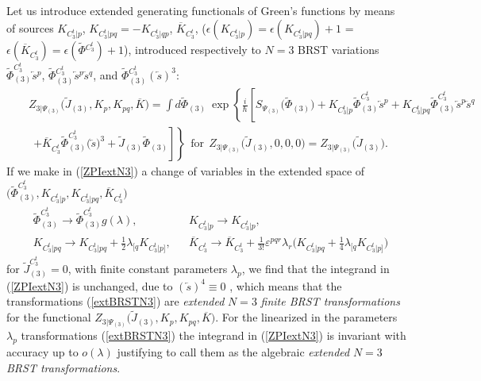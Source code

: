 \documentclass[10pt]{article}
\begin{document}
Let us introduce extended generating functionals of Green's functions
by means of sources $K_{C^t_3|p}$,  $K_{C^t_3|pq}=-K_{C^t_3|qp}$, $\overline{K}_{C^t_3}$,
($\epsilon(K_{C^t_3|p})=\epsilon(K_{C^t_3|pq})+1$ = $\epsilon(\overline{K}_{C^t_3})=\epsilon(\widetilde{\Phi}{}^{C^t_3})+1$),
introduced respectively to $N=3$ BRST variations $\widetilde{\Phi}^{C^t_3}_{(3)} \overleftarrow{s}{}^p$,
$\widetilde{\Phi}{}_{(3)}^{C^t_3} \overleftarrow{s}{}^p\overleftarrow{s}{}^q$, and $\widetilde{\Phi}{}_{(3)}^{C^t_3} (\overleftarrow{s})^3$:
\begin{eqnarray}
&& Z_{3|\Psi_{(3)}}\big(\widetilde{J}_{(3)}, K_{p},  K_{pq}, \overline{K}\big)=\int d\widetilde{\Phi}_{(3)}\ \exp\left\{
\frac{i}{\hbar}\left[  {S}_{\Psi_{(3)}}\big(\widetilde{\Phi}_{(3)}\big) +  K_{C^t_3|p} \widetilde{\Phi}_{(3)}^{C^t_3} \overleftarrow{s}^p + K_{C^t_3|pq} \widetilde{\Phi}_{(3)}^{C^t_3} \overleftarrow{s}^p\overleftarrow{s}^q \right.\right. \nonumber \\
&& \ \  \left.\left.+ \overline{K}_{C^t_3}  \widetilde{\Phi}_{(3)}^{C^t_3} \big(\overleftarrow{s}\big)^3%
+\widetilde{J}_{(3)}\widetilde{\Phi}_{(3)}\right]  \right\}    \ \ \mathrm{for}\ \ Z_{3|\Psi_{(3)}}\big(\widetilde{J}_{(3)},0,0,0\big)=Z_{3|\Psi_{(3)}}\big(\widetilde{J}_{(3)}\big).\label{ZPIextN3}%
\end{eqnarray}
If we make in (\ref{ZPIextN3}) a change of variables in the
extended space of $\big(\widetilde{\Phi}_{(3)}^{C_3^t}, K_{C_3^t|p},  K_{C_3^t|pq}, \overline{K}_{C_3^t}\big)$%
\begin{align}
& \widetilde{\Phi}_{(3)}^{C_3^t}\rightarrow\widetilde{\Phi}_{(3)}^{C_3^t} g(\lambda),&&  K_{{C_3^t}|p}\rightarrow K_{{C_3^t}|p},\label{extBRSTN3}\\
& K_{{C_3^t}|pq}\rightarrow K_{{C_3^t}|pq} + \frac{1}{2}\lambda_{[q}K_{{C_3^t}|p]}  , &&  \overline{K}_{C_3^t} \rightarrow \overline{K}_{C_3^t}  + \frac{1}{3!} \varepsilon^{pqr}\lambda_{r} \big(K_{{C_3^t}|pq} + \frac{1}{4}\lambda_{[q}K_{{C_3^t}|p]}\big)\nonumber
\end{align}
for $\widetilde{J}_{(3)}^{C_3^t}=0$, with finite constant parameters $\lambda_{p}$, we find that the
integrand in (\ref{ZPIextN3}) is unchanged, due to $(\overleftarrow{s})^4%
\equiv0$ , which means that the transformations
(\ref{extBRSTN3}) are \emph{extended} $N=3$ \emph{finite BRST transformations} for
the functional $Z_{3|\Psi_{(3)}}\big(\widetilde{J}_{(3)},K_{p},  K_{pq}, \overline{K}\big)$. For the linearized  in the parameters  $\lambda_p$  transformations (\ref{extBRSTN3}) the
integrand in (\ref{ZPIextN3}) is invariant with accuracy up to $o(\lambda)$ justifying to call  them as the algebraic \emph{extended} $N=3$ \emph{BRST transformations}.
\end{document}
